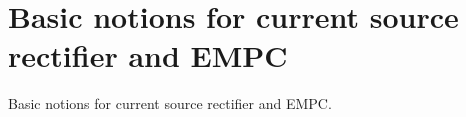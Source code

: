 \section{Basic notions for current source rectifier and EMPC}

Basic notions for current source rectifier and EMPC.


